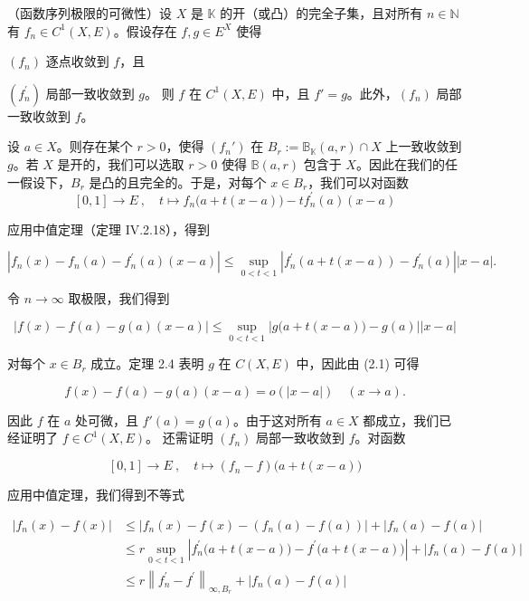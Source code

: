 \begin{theorem}

（函数序列极限的可微性）设 $X$ 是 $\mathbb{K}$ 的开（或凸）的完全子集，且对所有 $n \in \mathbb{N}$ 有 $f_n \in C^1(X, E)$。假设存在 $f, g \in E^X$ 使得

\begin{subitems}
\item

$(f_{n})$ 逐点收敛到 $f$，且

\item

$ (f_{n}^{\prime}) $ 局部一致收敛到 $ g $。
则 $f$ 在 $C^{1}(X,E)$ 中，且 $f'=g$。此外，$(f_{n})$ 局部一致收敛到 $f$。

\proofhead
设 $ a \in X $。则存在某个 $ r > 0 $，使得 $ (f_n') $ 在 $ B_r := \mathbb{B}_{\mathbb{K}}(a, r) \cap X $ 上一致收敛到 $ g $。若 $ X $ 是开的，我们可以选取 $ r > 0 $ 使得 $ \mathbb{B}(a, r) $ 包含于 $ X $。因此在我们的任一假设下，$ B_r $ 是凸的且完全的。于是，对每个 $ x \in B_r $，我们可以对函数
\[
[0,1]\to E~,\quad t\mapsto f_{n}\big(a+t(x-a)\big)-t f_{n}^{\prime}(a)(x-a)
\]

应用中值定理（定理 IV.2.18），得到

\[
\left|f_{n}(x)-f_{n}(a)-f_{n}^{\prime}(a)(x-a)\right|\leq\sup_{0<t<1}\left|f_{n}^{\prime}\left(a+t(x-a)\right)-f_{n}^{\prime}(a)\right|\left|x-a\right|.
\]

令 $ n \to \infty $ 取极限，我们得到

\begin{equation}
\left|f(x)-f(a)-g(a)(x-a)\right|\leq\sup_{0<t<1}\left|g\big(a+t(x-a)\big)-g(a)\right|\left|x-a\right|
\end{equation}

对每个 $ x \in B_r $ 成立。定理 2.4 表明 $ g $ 在 $ C(X, E) $ 中，因此由 (2.1) 可得

\[
f(x)-f(a)-g(a)(x-a)=o(|x-a|)\quad(x\to a).
\]

因此 $f$ 在 $a$ 处可微，且 $f'(a) = g(a)$。由于这对所有 $a \in X$ 都成立，我们已经证明了 $f \in C^1(X, E)$。
还需证明 $ (f_{n}) $ 局部一致收敛到 $ f $。对函数

\[
[0,1]\to E~,\quad t\mapsto(f_{n}-f)\big(a+t(x-a)\big)
\]

应用中值定理，我们得到不等式

\begin{equation*}
\begin{aligned}
\left|f_{n}(x)-f(x)\right|&\leq\left|f_{n}(x)-f(x)-\left(f_{n}(a)-f(a)\right)\right|+\left|f_{n}(a)-f(a)\right|\\&\leq r\sup_{0<t<1}\left|f_{n}^{\prime}\big(a+t(x-a)\big)-f^{\prime}\big(a+t(x-a)\big)\right|+\left|f_{n}(a)-f(a)\right|\\&\leq r\left\|f_{n}^{\prime}-f^{\prime}\right\|_{\infty,B_{r}}+\left|f_{n}(a)-f(a)\right|
\end{aligned}
\end{equation*}


\end{subitems}
\end{theorem}
